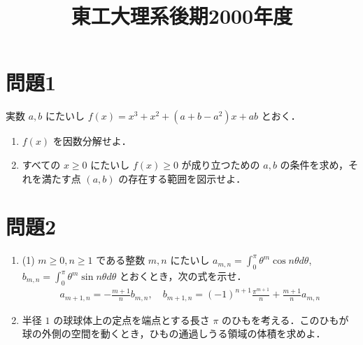 \documentclass[unicode,12pt, a4paper]{ltjsarticle}%
\title{東工大理系後期2000年度}
\begin{document}
\maketitle
\section{問題1}
実数 $a, b$ にたいし $f(x) = x^3 + x^2 + (a+b-a^2)x + ab$ とおく．

\begin{enumerate}
\item $f(x)$ を因数分解せよ．

\item すべての $x \ge 0$ にたいし $f(x) \ge 0$ が成り立つための $a, b$ の条件を求め，それを満たす点 $(a, b)$ の存在する範囲を図示せよ．
\end{enumerate}



\section{問題2}
\begin{enumerate}
    \item (1) $m \ge 0, n \ge 1$ である整数 $m, n$ にたいし $\displaystyle a_{m,n} = \int_0^\pi \theta^m \cos n\theta d\theta$, $\displaystyle b_{m,n} = \int_0^\pi \theta^m \sin n\theta d\theta$ とおくとき，次の式を示せ．
    \begin{align*}
 a_{m+1,n} = -\frac{m+1}{n}b_{m,n}, \quad b_{m+1,n} = (-1)^{n+1}\frac{\pi^{m+1}}{n} + \frac{m+1}{n}a_{m,n} 
\end{align*}

    \item 半径 $1$ の球球体上の定点を端点とする長さ $\pi$ のひもを考える．このひもが球の外側の空間を動くとき，ひもの通過しうる領域の体積を求めよ．
\end{enumerate}
\end{document}
